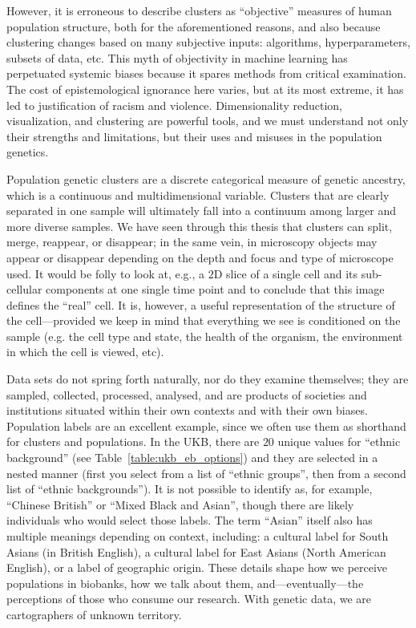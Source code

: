 However, it is erroneous to describe clusters as ``objective'' measures of human population structure, both for the aforementioned reasons, and also because clustering changes based on many subjective inputs: algorithms, hyperparameters, subsets of data, etc\citep{watson_philosophy_2023}. This myth of objectivity in machine learning has perpetuated systemic biases because it spares methods from critical examination\citep{gebru_race_2020}. The cost of epistemological ignorance here varies, but at its most extreme, it has led to justification of racism and violence\citep{panofsky_genetic_2019,panofsky_how_2021,carlson_counter_2022}. Dimensionality reduction, visualization, and clustering are powerful tools, and we must understand not only their strengths and limitations, but their uses and misuses in the population genetics. 

Population genetic clusters are a discrete categorical measure of genetic ancestry, which is a continuous and multidimensional variable. Clusters that are clearly separated in one sample will ultimately fall into a continuum among larger and more diverse samples\citep{lewis_getting_2022}. We have seen through this thesis that clusters can split, merge, reappear, or disappear; in the same vein, in microscopy objects may appear or disappear depending on the depth and focus and type of microscope used. It would be folly to look at, e.g., a $2$D slice of a single cell and its sub-cellular components at one single time point and to conclude that this image defines the ``real'' cell. It is, however, a useful representation of the structure of the cell---provided we keep in mind that everything we see is conditioned on the sample (e.g. the cell type and state, the health of the organism, the environment in which the cell is viewed, etc).

Data sets do not spring forth naturally, nor do they examine themselves; they are sampled, collected, processed, analysed, and are products of societies and institutions situated within their own contexts and with their own biases\citep{dignazio_data_2020}. Population labels are an excellent example, since we often use them as shorthand for clusters and populations. In the UKB, there are $20$ unique values for ``ethnic background'' (see Table~\ref{table:ukb_eb_options}) and they are selected in a nested manner (first you select from a list of ``ethnic groups'', then from a second list of ``ethnic backgrounds''). It is not possible to identify as, for example, ``Chinese British'' or ``Mixed Black and Asian'', though there are likely individuals who would select those labels. The term ``Asian'' itself also has multiple meanings depending on context, including: a cultural label for South Asians (in British English), a cultural label for East Asians (North American English), or a label of geographic origin. These details shape how we perceive populations in biobanks, how we talk about them, and---eventually---the perceptions of those who consume our research. With genetic data, we are cartographers of unknown territory.

